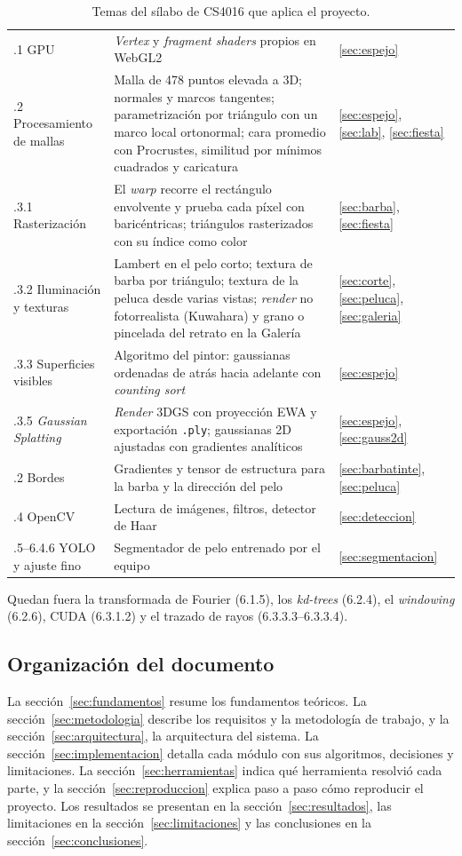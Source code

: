 \begin{table}[htbp]
\begin{tabularx}{\linewidth}{@{}>{\raggedright\arraybackslash}p{3.9cm} X l@{}}
6.3.1 GPU & \emph{Vertex} y \emph{fragment shaders} propios en WebGL2 & \ref{sec:espejo} \\
6.3.2 Procesamiento de mallas & Malla de 478 puntos elevada a 3D; normales y marcos tangentes; parametrización por triángulo con un marco local ortonormal; cara promedio con Procrustes, similitud por mínimos cuadrados y caricatura & \ref{sec:espejo}, \ref{sec:lab}, \ref{sec:fiesta} \\
6.3.3.1 Rasterización & El \emph{warp} recorre el rectángulo envolvente y prueba cada píxel con baricéntricas; triángulos rasterizados con su índice como color & \ref{sec:barba}, \ref{sec:fiesta} \\
6.3.3.2 Iluminación y texturas & Lambert en el pelo corto; textura de barba por triángulo; textura de la peluca desde varias vistas; \emph{render} no fotorrealista (Kuwahara) y grano o pincelada del retrato en la Galería & \ref{sec:corte}, \ref{sec:peluca}, \ref{sec:galeria} \\
6.3.3.3 Superficies visibles & Algoritmo del pintor: gaussianas ordenadas de atrás hacia adelante con \emph{counting sort} & \ref{sec:espejo} \\
6.3.3.5 \emph{Gaussian Splatting} & \emph{Render} 3DGS con proyección EWA y exportación \texttt{.ply}; gaussianas 2D ajustadas con gradientes analíticos & \ref{sec:espejo}, \ref{sec:gauss2d} \\
6.4.2 Bordes & Gradientes y tensor de estructura para la barba y la dirección del pelo & \ref{sec:barbatinte}, \ref{sec:peluca} \\
6.4.4 OpenCV & Lectura de imágenes, filtros, detector de Haar & \ref{sec:deteccion} \\
6.4.5--6.4.6 YOLO y ajuste fino & Segmentador de pelo entrenado por el equipo & \ref{sec:segmentacion} \\
\bottomrule
\end{tabularx}
\caption{Temas del sílabo de CS4016 que aplica el proyecto.}
\label{tab:temas}
\end{table}

Quedan fuera la transformada de Fourier (6.1.5), los \emph{kd-trees} (6.2.4), el \emph{windowing} (6.2.6), CUDA (6.3.1.2) y el trazado de rayos (6.3.3.3--6.3.3.4).

\subsection{Organización del documento}

La sección~\ref{sec:fundamentos} resume los fundamentos teóricos. La sección~\ref{sec:metodologia} describe los requisitos y la metodología de trabajo, y la sección~\ref{sec:arquitectura}, la arquitectura del sistema. La sección~\ref{sec:implementacion} detalla cada módulo con sus algoritmos, decisiones y limitaciones. La sección~\ref{sec:herramientas} indica qué herramienta resolvió cada parte, y la sección~\ref{sec:reproduccion} explica paso a paso cómo reproducir el proyecto. Los resultados se presentan en la sección~\ref{sec:resultados}, las limitaciones en la sección~\ref{sec:limitaciones} y las conclusiones en la sección~\ref{sec:conclusiones}.
